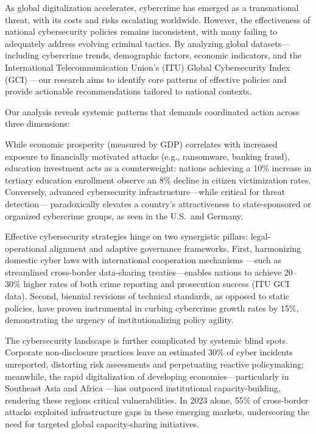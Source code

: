 
\vspace*{-3em}
As global digitalization accelerates,
cybercrime has emerged as a transnational threat, with its costs and risks escalating worldwide.
However, the effectiveness of national cybersecurity policies remains inconsistent,
with many failing to adequately address evolving criminal tactics.
By analyzing global datasets—including cybercrime trends, demographic factors, economic indicators,
and the International Telecommunication Union’s (ITU) Global Cybersecurity Index (GCI)
—our research aims to identify core patterns of effective policies and
provide actionable recommendations tailored to national contexts.


Our analysis reveals systemic patterns that demands coordinated action across three dimensions:

While economic prosperity (measured by GDP) correlates with increased exposure to financially
motivated attacks (e.g., ransomware, banking fraud), education investment acts as a counterweight:
nations achieving a 10\% increase in tertiary education enrollment
observe an 8\% decline in citizen victimization rates.
Conversely, advanced cybersecurity infrastructure—while critical for threat detection—
paradoxically elevates a country’s attractiveness to state-sponsored or organized cybercrime groups,
as seen in the U.S.\ and Germany.

Effective cybersecurity strategies hinge on two synergistic pillars:
legal-operational alignment and adaptive governance frameworks.
First, harmonizing domestic cyber laws with international cooperation mechanisms
—such as streamlined cross-border data-sharing treaties—enables nations to achieve
20--30\% higher rates of both crime reporting and prosecution success (ITU GCI data).
Second, biennial revisions of technical standards, as opposed to static policies,
have proven instrumental in curbing cybercrime growth rates by 15\%,
demonstrating the urgency of institutionalizing policy agility.

The cybersecurity landscape is further complicated by systemic blind spots.
Corporate non-disclosure practices leave an estimated 30\% of cyber incidents unreported,
distorting risk assessments and perpetuating reactive policymaking;
meanwhile, the rapid digitalization of developing economies—particularly in Southeast Asia and Africa
—has outpaced institutional capacity-building, rendering these regions critical vulnerabilities.
In 2023 alone, 55\% of cross-border attacks exploited infrastructure gaps in these emerging markets,
underscoring the need for targeted global capacity-sharing initiatives.


